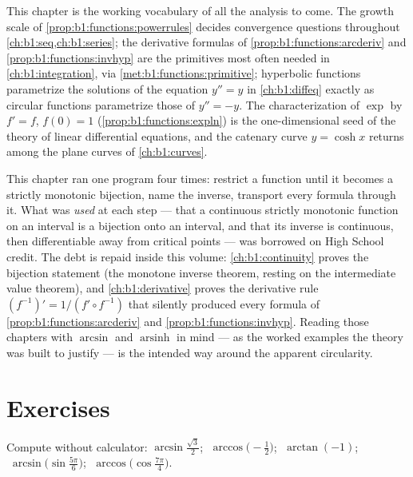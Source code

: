 \begin{remark}\label{rem:b1:functions:whereused}
This chapter is the working vocabulary of all the analysis to come.
The growth scale of \cref{prop:b1:functions:powerrules} decides
convergence questions throughout
\cref{ch:b1:seq,ch:b1:series}; the derivative formulas of
\cref{prop:b1:functions:arcderiv} and
\cref{prop:b1:functions:invhyp} are the primitives most often
needed in \cref{ch:b1:integration}, via
\cref{met:b1:functions:primitive}; hyperbolic functions
parametrize the solutions of the equation $y'' = y$ in
\cref{ch:b1:diffeq} exactly as circular functions parametrize
those of $y'' = -y$. The characterization of $\exp$ by $f' = f$,
$f(0) = 1$ (\cref{prop:b1:functions:expln}) is the one-dimensional
seed of the theory of linear differential equations, and the
catenary curve $y = \cosh x$ returns among the plane curves of
\cref{ch:b1:curves}.
\end{remark}

\begin{remark}\label{rem:b1:functions:interlude}
This chapter ran one program four times: restrict a function
until it becomes a strictly monotonic bijection, name the inverse,
transport every formula through it. What was \emph{used} at each
step --- that a continuous strictly monotonic function on an
interval is a bijection onto an interval, and that its inverse is
continuous, then differentiable away from critical points --- was
borrowed on High School credit. The debt is repaid inside this
volume: \cref{ch:b1:continuity} proves the bijection statement
(the monotone inverse theorem, resting on the intermediate value
theorem), and \cref{ch:b1:derivative} proves the derivative rule
$(f^{-1})' = 1/(f' \circ f^{-1})$ that silently produced every
formula of \cref{prop:b1:functions:arcderiv} and
\cref{prop:b1:functions:invhyp}. Reading those chapters with
$\arcsin$ and $\operatorname{arsinh}$ in mind --- as the worked
examples the theory was built to justify --- is the intended way
around the apparent circularity.
\end{remark}

\section{Exercises}

\begin{exercise}[$\star$]\label{exo:b1:functions:1}
Compute without calculator: $\arcsin\frac{\sqrt 3}{2}$;
$\;\arccos\bigl(-\frac 12\bigr)$; $\;\arctan(-1)$;
$\;\arcsin\bigl(\sin\frac{5\pi}{6}\bigr)$;
$\;\arccos\bigl(\cos\frac{7\pi}{4}\bigr)$.
\end{exercise}

